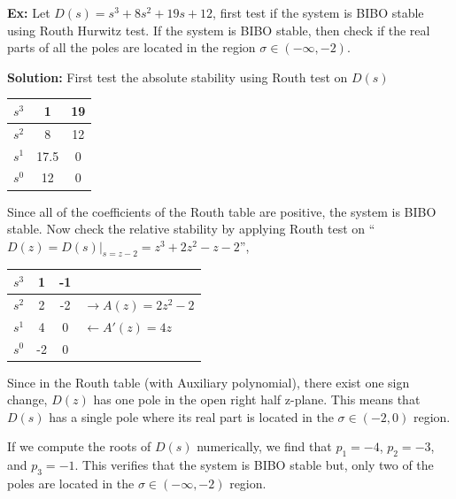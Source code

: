 \documentclass[twoside]{article}
\begin{document}
\textbf{Ex:} Let $D(s) = s^3 + 8 s^2 + 19 s + 12$, first test if the
system is BIBO stable using Routh Hurwitz test. If the system is BIBO 
stable, then check if the real parts of all the poles are located in the
region $\sigma \in (-\infty , -2)$.

\textbf{Solution:} First test the absolute stability using Routh test
on $D(s)$

\vspace{6pt}
\begin{minipage}[h]{1\linewidth}
\begin{center}
\begin{tabular}{|c || c || c  |}
\hline
$s^3$ & 1 & 19
\\ \hline
$s^2$ & 8 & 12
\\ \hline
$s^1$ & 17.5 & 0 
\\ \hline
$s^0$ & 12 & 0  
\\ \hline
\end{tabular}
\end{center}
\end{minipage}
\vspace{6pt}

Since all of the coefficients of the Routh table are positive, the
system is BIBO stable. Now check the relative stability by applying
Routh test on  ``$D(z) = D(s)|_{s = z - 2} =  z^3 + 2 z^2 - z - 2$'',

\vspace{6pt}
\begin{minipage}[h]{1\linewidth}
\begin{center}
\begin{tabular}{|c || c || c | l |}
\hline
$s^3$ & 1 & -1 & 
\\ \hline
$s^2$ & 2 & -2 & $\rightarrow A(z) = 2 z^2 - 2$
\\ \hline
$s^1$ & 4 & 0 & $\leftarrow A'(z) = 4 z $
\\ \hline
$s^0$ & -2 & 0 &
\\ \hline
\end{tabular}
\end{center}
\end{minipage}
\vspace{6pt}

Since in the Routh table (with Auxiliary polynomial), there exist one
sign change, $D(z)$ has one pole in the open right half z-plane.
This means that $D(s)$ has a single pole where its real part is 
located in the $\sigma \in (-2 , 0)$ region.

If we compute the roots of $D(s)$ numerically, we find that
$p_1 = -4$, $p_2 = -3$, and $p_3 = -1$. This verifies that
the system is BIBO stable but, only two of the poles are located
in the $\sigma \in (-\infty , -2)$ region.  
\end{document}
